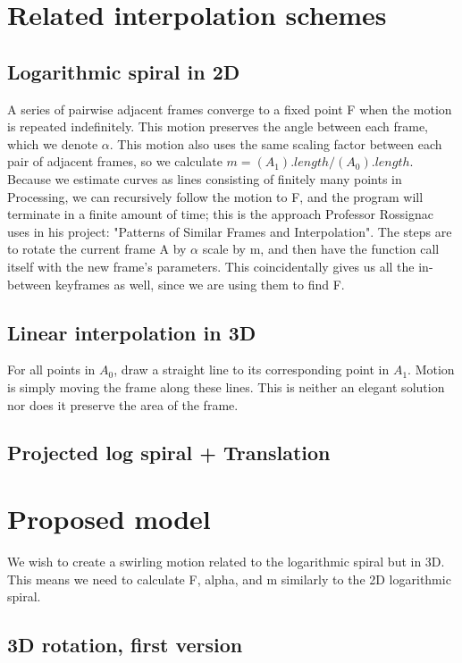 \documentclass[journal, letterpaper]{IEEEtran}
\begin{document}
\section{Related interpolation schemes}

\subsection{Logarithmic spiral in 2D}
A series of pairwise adjacent frames converge to a fixed point F when the motion is repeated indefinitely.  This motion preserves the angle between each frame, which we denote $\alpha$.  This motion also uses the same scaling factor between each pair of adjacent frames, so we calculate $m = (A_1).length / (A_0).length$.  Because we estimate curves as lines consisting of finitely many points in Processing, we can recursively follow the motion to F, and the program will terminate in a finite amount of time; this is the approach Professor Rossignac uses in his project: "Patterns of Similar Frames and Interpolation".  The steps are to rotate the current frame A by $\alpha$ scale by m, and then have the function call itself with the new frame's parameters.  This coincidentally gives us all the in-between keyframes as well, since we are using them to find F. 

\subsection{Linear interpolation in 3D}
For all points in $A_0$, draw a straight line to its corresponding point in $A_1$.  Motion is simply moving the frame along these lines.  This is neither an elegant solution nor does it preserve the area of the frame.

\subsection{Projected log spiral + Translation}


\section{Proposed model}
We wish to create a swirling motion related to the logarithmic spiral but in 3D.  This means we need to calculate F, alpha, and m similarly to the 2D logarithmic spiral.

\subsection{3D rotation, first version}
\end{document}
